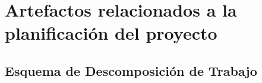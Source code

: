 \chapter{Artefactos relacionados a la planificación del proyecto}
\section{Esquema de Descomposición de Trabajo}



\cleardoublepage